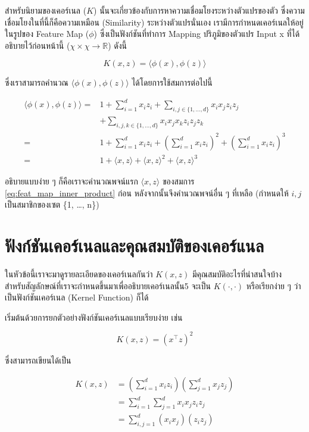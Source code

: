 สำหรับนิยามของเคอร์เนล ($K$) นั้นจะเกี่ยวข้องกับการหาความเชื่อมโยงระหว่างตัวแปรของตัว ซึ่งความเชื่อมโยงในที่นี้ก็คือความเหมือน (Similarity)
ระหว่างตัวแปรนั่นเอง เรามีการกำหนดเคอร์เนลให้อยู่ในรูปของ Feature Map ($\phi$) ซึ่งเป็นฟังก์ชันที่ทำการ Mapping ปริภูมิของตัวแปร Input x
ที่ได้อธิบายไว้ก่อนหน้านี้ ($\chi \times \chi \rightarrow \mathbb{R}$) ดังนี้

\begin{equation}
    K(x,z) = \langle\phi(x),\phi(z)\rangle
\end{equation}

\noindent ซึ่งเราสามารถคำนวณ $\langle\phi(x),\phi(z)\rangle$ ได้โดยการใช้สมการต่อไปนี้

\begin{align}
    \langle\phi(x),\phi(z)\rangle =& 1 + \sum_{i=1}^d x_i z_i + \sum_{i,j\in\{1,\ldots,d\}} x_i x_j z_i z_j \\
    &+ \sum_{i,j,k \in \{1,\ldots,d\}} x_i x_j x_k z_i z_j z_k \nonumber \\
    =& 1 + \sum_{i=1}^d x_i z_i + \left(\sum_{i=1}^d x_i z_i \right)^2 + \left( \sum_{i=1}^d x_i z_i \right)^3 \\
    =& 1 + \langle x,z \rangle + \langle x,z \rangle^2 + \langle x,z \rangle^3\label{eq:feat_map_inner_product}
\end{align}

\noindent อธิบายแบบง่าย ๆ ก็คือเราจะคำนวณพจน์แรก $ \langle x,z \rangle$ ของสมการ \ref{eq:feat_map_inner_product} ก่อน 
หลังจากนั้นจึงคำนวณพจน์อื่น ๆ ที่เหลือ (กำหนดให้ $i,j$ เป็นสมาชิกของเซต \{1, \dots, n\})

\section{ฟังก์ชันเคอร์เนลและคุณสมบัติของเคอร์แนล}

ในหัวข้อนี้เราจะมาดูรายละเอียดของเคอร์เนลกันว่า $K(x,z)$ มีคุณสมบัติอะไรที่น่าสนใจบ้าง สำหรับสัญลักษณ์ที่เราจะกำหนดขึ้นมาเพื่ออธิบายเคอร์เนลนั้น5
จะเป็น $K(\cdot,\cdot)$ หรือเรียกง่าย ๆ ว่าเป็นฟังก์ชันเคอร์เนล (Kernel Function) ก็ได้ 

เริ่มต้นด้วยการยกตัวอย่างฟังก์ชันเคอร์เนลแบบเรียบง่าย เช่น

\begin{equation}
    K(x,z) = (x^{\top} z)^{2}
\end{equation}

\noindent ซึ่งสามารถเขียนได้เป็น

\begin{align}
    K(x,z) &= \left( \sum_{i=1}^d x_i z_i \right) \left( \sum_{j=1}^d x_j z_j \right)\\
    &= \sum_{i=1}^d \sum_{j=1}^d x_i x_j z_i z_j\\
    &= \sum_{i,j=1}^d (x_i x_j)(z_i z_j)
\end{align}

